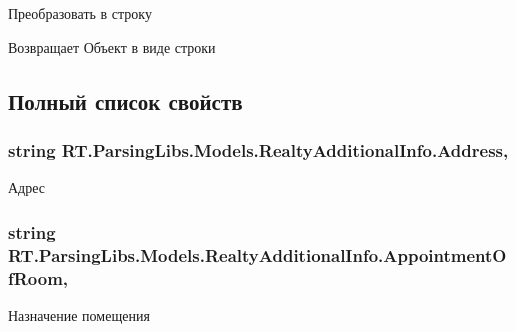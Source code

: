 Преобразовать в строку 

\begin{DoxyReturn}{Возвращает}
Объект в виде строки
\end{DoxyReturn}


\subsection{Полный список свойств}
\hypertarget{class_r_t_1_1_parsing_libs_1_1_models_1_1_realty_additional_info_a7abbfb44a630c3d2b9d050d26db6a9c4}{
\subsubsection[{Address}]{\setlength{\rightskip}{0pt plus 5cm}string R\+T.\+Parsing\+Libs.\+Models.\+Realty\+Additional\+Info.\+Address\hspace{0.3cm}{\ttfamily [get]}, {\ttfamily [set]}}}\label{class_r_t_1_1_parsing_libs_1_1_models_1_1_realty_additional_info_a7abbfb44a630c3d2b9d050d26db6a9c4}


Адрес 

\hypertarget{class_r_t_1_1_parsing_libs_1_1_models_1_1_realty_additional_info_ae3401a05dd43d8afbda00fffc5b16b78}{
\subsubsection[{Appointment\+Of\+Room}]{\setlength{\rightskip}{0pt plus 5cm}string R\+T.\+Parsing\+Libs.\+Models.\+Realty\+Additional\+Info.\+Appointment\+Of\+Room\hspace{0.3cm}{\ttfamily [get]}, {\ttfamily [set]}}}\label{class_r_t_1_1_parsing_libs_1_1_models_1_1_realty_additional_info_ae3401a05dd43d8afbda00fffc5b16b78}


Назначение помещения 

